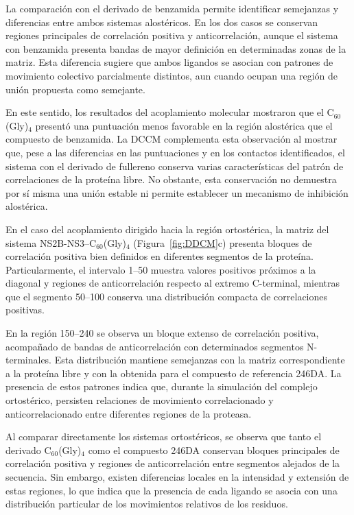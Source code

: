 La comparación con el derivado de benzamida permite identificar semejanzas y diferencias entre ambos sistemas alostéricos. En los dos casos se conservan regiones principales de correlación positiva y anticorrelación, aunque el sistema con benzamida presenta bandas de mayor definición en determinadas zonas de la matriz. Esta diferencia sugiere que ambos ligandos se asocian con patrones de movimiento colectivo parcialmente distintos, aun cuando ocupan una región de unión propuesta como semejante.

En este sentido, los resultados del acoplamiento molecular mostraron que el C$_{60}$(Gly)$_4$ presentó una puntuación menos favorable en la región alostérica que el compuesto de benzamida. La DCCM complementa esta observación al mostrar que, pese a las diferencias en las puntuaciones y en los contactos identificados, el sistema con el derivado de fullereno conserva varias características del patrón de correlaciones de la proteína libre. No obstante, esta conservación no demuestra por sí misma una unión estable ni permite establecer un mecanismo de inhibición alostérica.

En el caso del acoplamiento dirigido hacia la región ortostérica, la matriz del sistema NS2B-NS3--C$_{60}$(Gly)$_4$ (Figura~\ref{fig:DDCM}c) presenta bloques de correlación positiva bien definidos en diferentes segmentos de la proteína. Particularmente, el intervalo 1--50 muestra valores positivos próximos a la diagonal y regiones de anticorrelación respecto al extremo C-terminal, mientras que el segmento 50--100 conserva una distribución compacta de correlaciones positivas.

En la región 150--240 se observa un bloque extenso de correlación positiva, acompañado de bandas de anticorrelación con determinados segmentos N-terminales. Esta distribución mantiene semejanzas con la matriz correspondiente a la proteína libre y con la obtenida para el compuesto de referencia 246DA. La presencia de estos patrones indica que, durante la simulación del complejo ortostérico, persisten relaciones de movimiento correlacionado y anticorrelacionado entre diferentes regiones de la proteasa.

Al comparar directamente los sistemas ortostéricos, se observa que tanto el derivado C$_{60}$(Gly)$_4$ como el compuesto 246DA conservan bloques principales de correlación positiva y regiones de anticorrelación entre segmentos alejados de la secuencia. Sin embargo, existen diferencias locales en la intensidad y extensión de estas regiones, lo que indica que la presencia de cada ligando se asocia con una distribución particular de los movimientos relativos de los residuos.

